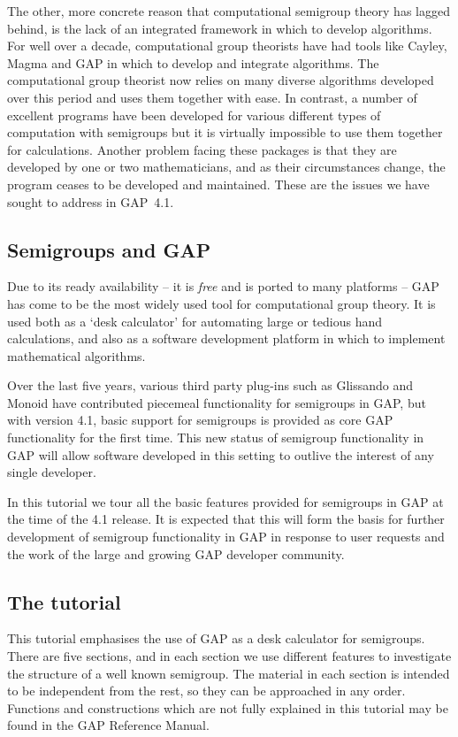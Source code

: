 \documentclass{ws-p8-50x6-00}
\theoremstyle{plain} \newtheorem{Thm}{Theorem}
\theoremstyle{plain} \newtheorem{Cor}{Corollary}
\theoremstyle{plain} \newtheorem{Lemma}{Lemma}
\theoremstyle{plain} \newtheorem{Prop}{Proposition}
\theoremstyle{plain} \newtheorem{Ex}{Exercise}
\def\gap{\sf GAP}
\begin{document}
The other, more concrete reason that computational semigroup theory
has lagged behind, is the lack of an integrated framework
in which to develop algorithms. For well over a decade, computational group
theorists have had tools like Cayley, Magma\cite{magma} and {\gap}\cite{gap}
in which to
develop and integrate algorithms. The computational group theorist
now relies on many diverse algorithms developed over this period and
uses them together with ease. In contrast, a number of excellent
programs have been developed for various different types of computation
with semigroups
but it is virtually impossible to use them together for calculations.
Another  problem facing these packages is that they are developed by one
or two mathematicians, and as their circumstances change,
the program ceases to be
developed and maintained. These are the issues we have sought to
address in  {\gap}~4.1.


\subsection*{Semigroups and {\gap}}
Due to its ready availability --
it is {\em free} and is ported to many platforms -- 
{\gap} has come to be the most widely used tool
for computational group theory. It is used both as a 
`desk calculator' for automating
large or tedious hand calculations, and also 
as a software development platform in which to implement
mathematical algorithms. 

Over the last five years, various third party
plug-ins such as Glissando\cite{gliss} and 
Monoid\cite{monoid} have contributed piecemeal
functionality for semigroups in {\gap}, but 
with version 4.1, basic support for semigroups is provided
as core {\gap} functionality for the first time. This 
new status of semigroup functionality in {\gap} will allow 
software developed in this setting
to outlive the interest of any single developer.

In this tutorial we tour all the basic features provided
for semigroups in {\gap} at the time of the 4.1 release.
It is expected that this 
will form the basis for further development of semigroup
functionality in {\gap} in response to user requests and
the work of the large and growing {\gap} developer community.

\subsection*{The tutorial}
This tutorial emphasises the use of 
{\gap} as a desk calculator
for semigroups. There are five sections,  and in each section
we use different features to investigate the structure of 
a well known semigroup. The material in each section is intended
to be independent from the rest, so they can be approached in any
order. Functions and constructions which are not fully explained
in this tutorial may be found in the {\gap} Reference Manual\cite{gapref}.
\end{document}
